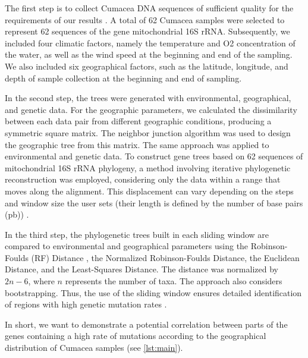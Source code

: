     The first step is to collect Cumacea DNA sequences of sufficient quality for the requirements of our results \citep{koshkarov_phylogeography_2022}. A total of 62 Cumacea samples were selected to represent 62 sequences of the gene mitochondrial 16S rRNA. Subsequently, we included four climatic factors, namely the temperature and O2 concentration of the water, as well as the wind speed at the beginning and end of the sampling. We also included six geographical factors, such as the latitude, longitude, and depth of sample collection at the beginning and end of sampling.

    In the second step, the trees were generated with environmental, geographical, and genetic data. For the geographic parameters, we calculated the dissimilarity between each data pair from different geographic conditions, producing a symmetric square matrix. The neighbor junction algorithm was used to design the geographic tree from this matrix. The same approach was applied to environmental and genetic data. To construct gene trees based on 62 sequences of mitochondrial 16S rRNA phylogeny, a method involving iterative phylogenetic reconstruction was employed, considering only the data within a range that moves along the alignment. This displacement can vary depending on the steps and window size the user sets (their length is defined by the number of base pairs (pb)) \citep{koshkarov_phylogeography_2022}.

    In the third step, the phylogenetic trees built in each sliding window are compared to environmental and geographical parameters using the Robinson-Foulds (RF) Distance \citep{robinson_comparison_1981,koshkarov_phylogeography_2022}, the Normalized Robinson-Foulds Distance, the Euclidean Distance, and the Least-Squares Distance. The distance was normalized by $2n-6$, where $n$ represents the number of taxa. The approach also considers bootstrapping. Thus, the use of the sliding window ensures detailed identification of regions with high genetic mutation rates \citep{koshkarov_phylogeography_2022}.

In short, we want to demonstrate a potential correlation between parts of the genes containing a high rate of mutations according to the geographical distribution of Cumacea samples (see \autoref{lst:main}). 

